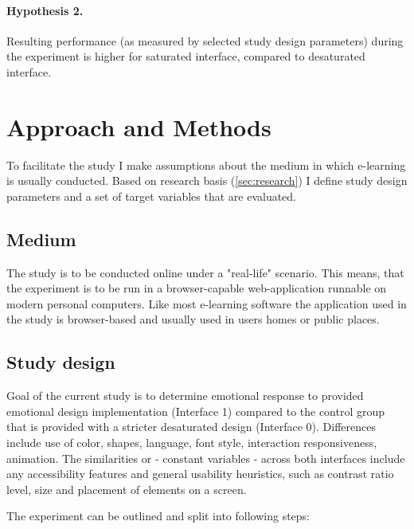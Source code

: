 		\paragraph{Hypothesis 2.} Resulting performance (as measured by selected study design parameters) during the experiment is higher for saturated interface, compared to desaturated interface.

\section{Approach and Methods}

To facilitate the study I make assumptions about the medium in which e-learning is usually conducted. Based on research basis (\ref{sec:research}) I define study design parameters and a set of target variables that are evaluated.

	\subsection{Medium}
	
	The study is to be conducted online under a "real-life" scenario. This means, that the experiment is to be run in a browser-capable web-application runnable on modern personal computers. Like most e-learning software the  application used in the study is browser-based and usually used in users homes or public places.
	
	\subsection{Study design} \label{sec:study-design}
	
	Goal of the current study is to determine emotional response to provided emotional design implementation (Interface 1) compared to the control group that is provided with a stricter desaturated design (Interface 0). Differences include use of color, shapes, language, font style, interaction responsiveness, animation. The similarities or - constant variables - across both interfaces include any accessibility features and general usability heuristics, such as contrast ratio level, size and placement of elements on a screen.
	
	The experiment can be outlined and split into following steps:
	

